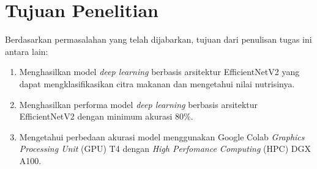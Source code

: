 \section{Tujuan Penelitian}
Berdasarkan permasalahan yang telah dijabarkan, tujuan dari penulisan tugas ini antara lain:
\begin{enumerate}
    \item Menghasilkan model \textit{deep learning} berbasis arsitektur EfficientNetV2 yang dapat mengklasifikasikan citra makanan dan mengetahui nilai nutrisinya.
    \item Menghasilkan performa model \textit{deep learning} berbasis arsitektur EfficientNetV2 dengan minimum akurasi 80\%.
    \item Mengetahui perbedaan akurasi model menggunakan Google Colab \textit{Graphics Processing Unit} (GPU) T4 dengan \textit{High Perfomance Computing} (HPC) DGX A100.
\end{enumerate}

